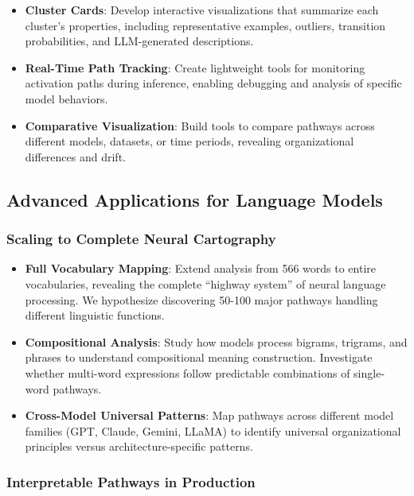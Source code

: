 \begin{itemize}
    \item \textbf{Cluster Cards}: Develop interactive visualizations that summarize each cluster's properties, including representative examples, outliers, transition probabilities, and LLM-generated descriptions.
    
    \item \textbf{Real-Time Path Tracking}: Create lightweight tools for monitoring activation paths during inference, enabling debugging and analysis of specific model behaviors.
    
    \item \textbf{Comparative Visualization}: Build tools to compare pathways across different models, datasets, or time periods, revealing organizational differences and drift.
\end{itemize}

\subsection{Advanced Applications for Language Models}

\subsubsection{Scaling to Complete Neural Cartography}

\begin{itemize}
    \item \textbf{Full Vocabulary Mapping}: Extend analysis from 566 words to entire vocabularies, revealing the complete ``highway system'' of neural language processing. We hypothesize discovering 50-100 major pathways handling different linguistic functions.
    
    \item \textbf{Compositional Analysis}: Study how models process bigrams, trigrams, and phrases to understand compositional meaning construction. Investigate whether multi-word expressions follow predictable combinations of single-word pathways.
    
    \item \textbf{Cross-Model Universal Patterns}: Map pathways across different model families (GPT, Claude, Gemini, LLaMA) to identify universal organizational principles versus architecture-specific patterns.
\end{itemize}

\subsubsection{Interpretable Pathways in Production}


